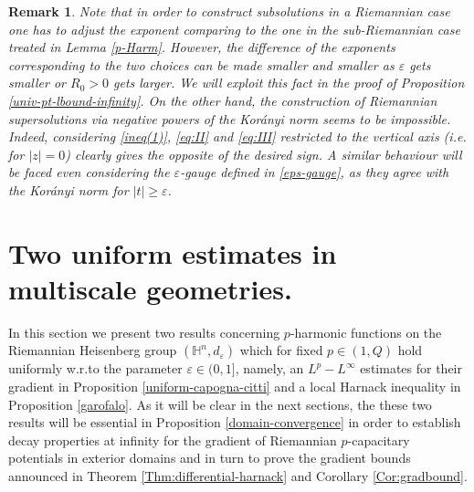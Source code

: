 \documentclass[10pt]{amsart}
\numberwithin{equation}{section}
\newtheorem{remark}[theorem]{Remark}
\theoremstyle{definition}
\newcommand{\He}{\mathbb{H}}
\begin{document}
 \begin{remark}
 \label{expchoice}
{\rm  Note that in order to construct subsolutions in a Riemannian case one has to adjust the exponent comparing to the one in the sub-Riemannian case treated in Lemma \ref{p-Harm}. However, the difference of the exponents corresponding to the two choices can be made smaller and smaller as $\varepsilon$ gets smaller or $R_0>0$ gets larger. We will exploit this fact in the proof of Proposition \ref{univ-pt-lbound-infinity}. On the other hand, the construction of Riemannian supersolutions via negative powers of the Kor\'{a}nyi norm seems to be impossible. Indeed, considering \eqref{ineq(1)}, \eqref{eq:II} and \eqref{eq:III} restricted to the vertical axis (i.e. for $|z|=0$) clearly gives the opposite of the desired sign. A similar behaviour will be faced even considering the $\varepsilon$-gauge defined in \eqref{eps-gauge}, as they agree with the Kor\'{a}nyi norm for $|t|\geq \varepsilon$.} 
 \end{remark}


\section{Two uniform estimates in multiscale geometries.}

In this section we present two results concerning $p$-harmonic functions on the Riemannian Heisenberg group $(\He^n, d_\varepsilon)$ which for fixed $p \in (1,Q)$ hold uniformly w.r.to the parameter $\varepsilon \in (0,1]$, namely, an $L^p-L^\infty$ estimates for their gradient in Proposition \ref{uniform-capogna-citti} and a local Harnack inequality in Proposition \ref{garofalo}. 
As it will be clear in the next sections, the these two results will be essential in Proposition \ref{domain-convergence} in order to establish decay properties at infinity for the gradient of Riemannian $p$-capacitary potentials in exterior domains and in turn to prove the gradient bounds announced in Theorem \ref{Thm:differential-harnack} and Corollary \ref{Cor:gradbound}. 
\end{document}
